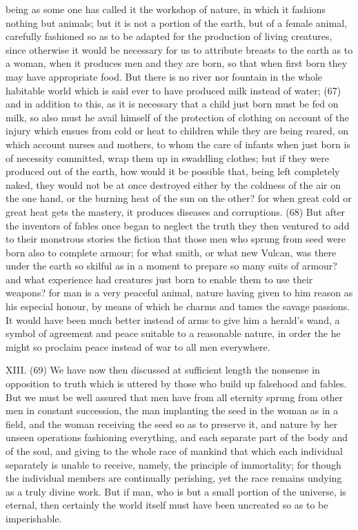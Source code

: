 being as some one has called it the workshop of nature, in which it fashions nothing but animals;
but it is not a portion of the earth, but of a female animal, carefully fashioned so as to be adapted
for the production of living creatures, since otherwise it would be necessary for us to attribute
breasts to the earth as to a woman, when it produces men and they are born, so that when first
born they may have appropriate food. But there is no river nor fountain in the whole habitable world
which is said ever to have produced milk instead of water; (67) and in addition to this, as it is
necessary that a child just born must be fed on milk, so also must he avail himself of the protection
of clothing on account of the injury which ensues from cold or heat to children while they are being
reared, on which account nurses and mothers, to whom the care of infants when just born is of
necessity committed, wrap them up in swaddling clothes; but if they were produced out of the earth,
how would it be possible that, being left completely naked, they would not be at once destroyed
either by the coldness of the air on the one hand, or the burning heat of the sun on the other? for
when great cold or great heat gets the mastery, it produces diseases and corruptions. (68) But
after the inventors of fables once began to neglect the truth they then ventured to add to their
monstrous stories the fiction that those men who sprung from seed were born also to complete
armour; for what smith, or what new Vulcan, was there under the earth so skilful as in a moment to
prepare so many suits of armour? and what experience had creatures just born to enable them to
use their weapons? for man is a very peaceful animal, nature having given to him reason as his
especial honour, by means of which he charms and tames the savage passions. It would have
been much better instead of arms to give him a herald's wand, a symbol of agreement and peace
suitable to a reasonable nature, in order the he might so proclaim peace instead of war to all men
everywhere.

XIII. (69) We have now then discussed at sufficient length the nonsense in opposition to truth
which is uttered by those who build up falsehood and fables. But we must be well assured that men
have from all eternity sprung from other men in constant succession, the man implanting the seed
in the woman as in a field, and the woman receiving the seed so as to preserve it, and nature by
her unseen operations fashioning everything, and each separate part of the body and of the soul,
and giving to the whole race of mankind that which each individual separately is unable to receive,
namely, the principle of immortality; for though the individual members are continually perishing, yet
the race remains undying as a truly divine work. But if man, who is but a small portion of the
universe, is eternal, then certainly the world itself must have been uncreated so as to be
imperishable.

